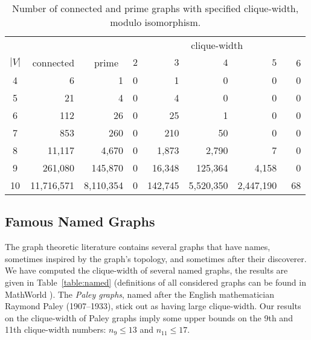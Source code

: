 \documentclass[10pt,usletter]{article}
\theoremstyle{remark}
\begin{document}
\begin{table}[htb]
\caption{Number of connected and prime graphs with specified clique-width, modulo isomorphism.}\label{table:sequence}
\centering
\medskip
\begin{tabular}{@{}c@{~~~~~~~~}r@{~~~}r@{~~~~~~}@{~~~}r@{~~~}r@{~~~}r@{~~~}r@{~~~}r@{}}
\toprule
&&& \multicolumn{5}{c}{clique-width}\\
\cmidrule{4-8}
$|V|$ & connected & prime~ & $2$ & $3$ & $4$ & $5$ & ~~$6$ \\ 
\midrule
4 &             6 &        1   &  0   &          1   &              0   &       0  & 0\\
5 &           21 &       4   &  0   &          4   &              0   &       0  & 0\\
6 &        112 &      26  & 0   &        25   &              1  &        0 & 0\\
7 &        853 &    260  &  0   &      210  &            50   &       0 & 0\\
8 &   11,117 & 4,670  &  0  &     1,873  &      2,790  &        7 & 0\\
9 &   261,080  & 145,870  & 0&  16,348 &   125,364  & 4,158 & 0\\
10 &   11,716,571  & 8,110,354  & 0&  142,745 &   5,520,350  & 2,447,190 & 68\\

\toprule
\end{tabular}
\end{table} 


\subsection{Famous Named Graphs}
\label{sec:famous}

The graph theoretic literature contains several graphs that have
names, sometimes inspired by the graph's topology, and sometimes after
their discoverer. 
We have computed the clique-width of several named graphs,
the results are given in Table~\ref{table:named} (definitions of all
considered graphs can be found in MathWorld \cite{MathWorld}).  The
\emph{Paley graphs}, named after the English mathematician Raymond
Paley (1907--1933), stick out as having large clique-width. Our
results on the clique-width of Paley graphs imply some upper bounds on
the 9th and 11th clique-width numbers: $n_9\leq 13$ and $n_{11}\leq
17$.
 
\end{document}
